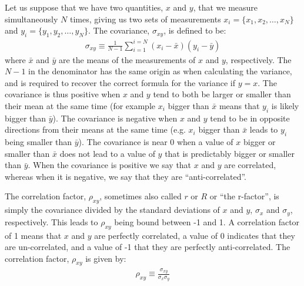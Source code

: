 Let us suppose that we have two quantities, $x$ and $y$, that we measure simultaneously $N$ times, giving us two sets of measurements  $x_i=\{x_1, x_2,\dots, x_N\}$ and $y_i=\{y_1, y_2,\dots, y_N\}$. The covariance, $\sigma_{xy}$, is defined to be:
\begin{align}
\sigma_{xy}\equiv\frac{1}{N-1}\sum_{i=1}^{i=N}(x_i-\bar x)(y_i-\bar y)
\end{align}
where $\bar x$ and $\bar y$ are the means of the measurements of $x$ and $y$, respectively. The $N-1$ in the denominator has the same origin as when calculating the variance, and is required to recover the correct formula for the variance if $y=x$. The covariance is thus positive when $x$ and $y$ tend to both be larger or smaller than their mean at the same time (for example $x_i$ bigger than $\bar x$ means that $y_i$ is likely bigger than $\bar y$). The covariance is negative when $x$ and $y$ tend to be in opposite directions from their means at the same time (e.g. $x_i$ bigger than $\bar x$ leads to $y_i$ being smaller than $\bar y$). The covariance is near 0 when a value of $x$ bigger or smaller than $\bar x$ does not lead to a value of $y$ that is predictably bigger or smaller than $\bar y$. When the covariance is positive we say that $x$ and $y$ are correlated, whereas when it is negative, we say that they are ``anti-correlated''.

The correlation factor, $\rho_{xy}$, sometimes also called $r$ or $R$ or ``the r-factor'', is simply the covariance divided by the standard deviations of $x$ and $y$, $\sigma_x$ and $\sigma_y$, respectively. This leads to $\rho_{xy}$ being bound between -1 and 1. A correlation factor of 1 means that $x$ and $y$ are perfectly correlated, a value of 0 indicates that they are un-correlated, and a value of -1 that they are perfectly anti-correlated. The correlation factor, $\rho_{xy}$ is given by:
\begin{align}
\rho_{xy}\equiv\frac{\sigma_{xy}}{\sigma_x\sigma_y}
\end{align}

